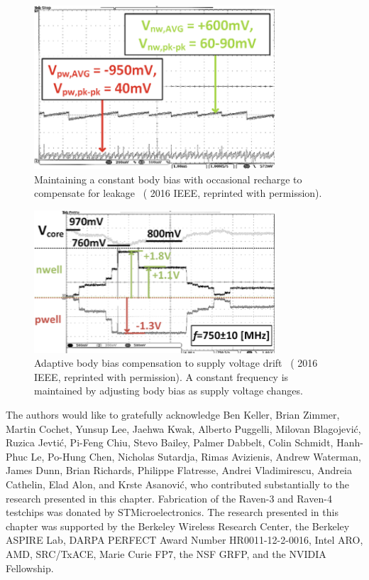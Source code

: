 \documentclass[graybox]{svmult}
\begin{document}
\begin{figure}
  \centering
  \includegraphics[width=0.8\textwidth]{bbgen-results-tracking}
  \caption{Maintaining a constant body bias with occasional recharge to compensate for leakage~\cite{Blagojevic2016} ({\textcopyright} 2016 IEEE, reprinted with permission).}
  \label{fig:bbgen-results-tracking}
\end{figure}

\begin{figure}
  \centering
  \includegraphics[width=0.8\textwidth]{bbgen-results-compensation}
  \caption{Adaptive body bias compensation to supply voltage drift~\cite{Blagojevic2016} ({\textcopyright} 2016 IEEE, reprinted with permission).  A constant frequency is maintained by adjusting body bias as supply voltage changes.}
  \label{fig:bbgen-results-compensation}
\end{figure}

\begin{acknowledgement}
The authors would like to gratefully acknowledge Ben Keller, Brian Zimmer, Martin Cochet, Yunsup Lee, Jaehwa Kwak, Alberto Puggelli, Milovan Blagojevi\'{c}, Ruzica Jevti\'{c}, Pi-Feng Chiu, Stevo Bailey, Palmer Dabbelt, Colin Schmidt, Hanh-Phuc Le, Po-Hung Chen, Nicholas Sutardja, Rimas Avizienis, Andrew Waterman, James Dunn, Brian Richards, Philippe Flatresse, Andrei Vladimirescu, Andreia Cathelin, Elad Alon, and Krste Asanovi\'{c}, who contributed substantially to the research presented in this chapter.
Fabrication of the Raven-3 and Raven-4 testchips was donated by STMicroelectronics.
The research presented in this chapter was supported by the Berkeley Wireless Research Center, the Berkeley ASPIRE Lab, DARPA PERFECT Award Number HR0011-12-2-0016, Intel ARO, AMD, SRC/TxACE, Marie Curie FP7, the NSF GRFP, and the NVIDIA Fellowship.
\end{acknowledgement}



\printbibliography
\end{document}
